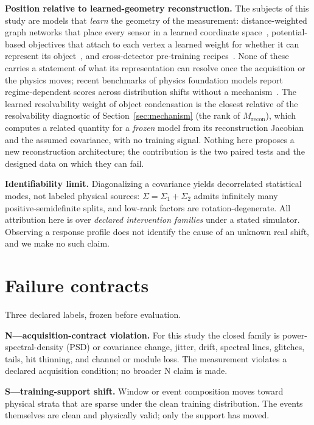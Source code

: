 \documentclass[10pt,twocolumn]{extarticle}
\begin{document}
\textbf{Position relative to learned-geometry reconstruction.} The subjects
of this study are models that \emph{learn} the geometry of the measurement:
distance-weighted graph networks that place every sensor in a learned
coordinate space~\cite{gravnet}, potential-based objectives that attach to
each vertex a learned weight for whether it can represent its
object~\cite{objcond}, and cross-detector pre-training
recipes~\cite{panda2}. None of these carries a statement of what its
representation can resolve once the acquisition or the physics moves; recent
benchmarks of physics foundation models report regime-dependent scores across
distribution shifts without a mechanism~\cite{fmbench}. The learned
resolvability weight of object condensation is the closest relative of the
resolvability diagnostic of Section~\ref{sec:mechanism} (the rank of
$M_{\mathrm{recon}}$), which computes a related quantity for a \emph{frozen}
model from its reconstruction Jacobian and the assumed covariance, with no
training signal. Nothing here proposes a new reconstruction architecture; the
contribution is the two paired tests and the designed data on which they can
fail.

\textbf{Identifiability limit.} Diagonalizing a covariance yields decorrelated
statistical modes, not labeled physical sources: $\Sigma=\Sigma_1+\Sigma_2$
admits infinitely many positive-semidefinite splits, and low-rank factors are
rotation-degenerate. All attribution here is over \emph{declared intervention
families} under a stated simulator. Observing a response profile does not
identify the cause of an unknown real shift, and we make no such claim.

\section{Failure contracts}

Three declared labels, frozen before evaluation.

\textbf{N---acquisition-contract violation.} For this study the closed family
is power-spectral-density (PSD) or covariance change, jitter, drift, spectral
lines, glitches, tails, hit thinning, and channel or module loss. The
measurement violates a declared acquisition condition; no broader N claim is
made.

\textbf{S---training-support shift.} Window or event composition moves toward
physical strata that are sparse under the clean training distribution. The
events themselves are clean and physically valid; only the support has moved.
\end{document}

